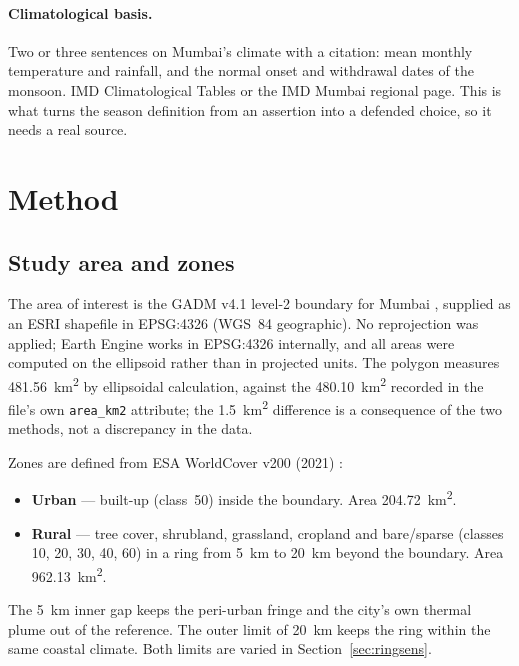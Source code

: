 \documentclass[11pt,a4paper]{article}
\newcommand\TODO{}
\begin{document}
\paragraph{Climatological basis.}
\TODO{Two or three sentences on Mumbai's climate with a citation:
mean monthly temperature and rainfall, and the normal onset and
withdrawal dates of the monsoon. IMD Climatological Tables or the
IMD Mumbai regional page. This is what turns the season definition
from an assertion into a defended choice, so it needs a real source.}

\section{Method}

\subsection{Study area and zones}

The area of interest is the GADM v4.1 level-2 boundary for Mumbai
\citep{gadm}, supplied as an ESRI shapefile in EPSG:4326 (WGS~84
geographic). No reprojection was applied; Earth Engine works in
EPSG:4326 internally, and all areas were computed on the ellipsoid
rather than in projected units. The polygon measures
\SI{481.56}{\kilo\metre\squared} by ellipsoidal calculation, against
the \SI{480.10}{\kilo\metre\squared} recorded in the file's own
\texttt{area\_km2} attribute; the \SI{1.5}{\kilo\metre\squared}
difference is a consequence of the two methods, not a discrepancy in
the data.

Zones are defined from ESA WorldCover v200 (2021) \citep{worldcover}:

\begin{itemize}
  \item \textbf{Urban} --- built-up (class~50) inside the boundary.
        Area \SI{204.72}{\kilo\metre\squared}.
  \item \textbf{Rural} --- tree cover, shrubland, grassland, cropland
        and bare/sparse (classes 10, 20, 30, 40, 60) in a ring from
        \SI{5}{\kilo\metre} to \SI{20}{\kilo\metre} beyond the
        boundary. Area \SI{962.13}{\kilo\metre\squared}.
\end{itemize}

The \SI{5}{\kilo\metre} inner gap keeps the peri-urban fringe and the
city's own thermal plume out of the reference. The outer limit of
\SI{20}{\kilo\metre} keeps the ring within the same coastal climate.
Both limits are varied in Section~\ref{sec:ringsens}.
\end{document}
